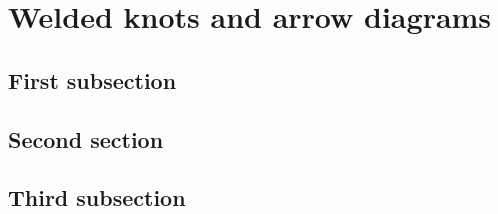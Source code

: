 \chapter{Welded knots and arrow diagrams}

\section{First subsection}

\section{Second section}

\section{Third subsection}
